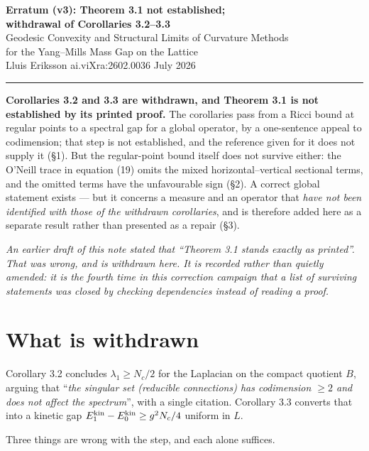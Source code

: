 \documentclass[11pt]{article}
\begin{document}
\begin{center}
{\Large\bfseries Erratum (v3): Theorem 3.1 not established;\\
withdrawal of Corollaries 3.2--3.3}\\[5pt]
{\large Geodesic Convexity and Structural Limits of Curvature Methods\\
for the Yang--Mills Mass Gap on the Lattice}\\[6pt]
Lluis Eriksson \quad\textbullet\quad ai.viXra:2602.0036 \quad\textbullet\quad July 2026
\end{center}

\noindent\rule{\textwidth}{0.8pt}

\vspace{2pt}
\noindent
\textbf{Corollaries 3.2 and 3.3 are withdrawn, and Theorem 3.1 is not established by
its printed proof.} The corollaries pass from a Ricci bound at regular points to a
spectral gap for a global operator, by a one-sentence appeal to codimension; that step
is not established, and the reference given for it does not supply it (\S1). But the
regular-point bound itself does not survive either: the O'Neill trace in equation (19)
omits the mixed horizontal--vertical sectional terms, and the omitted terms have the
unfavourable sign (\S2). A correct global statement exists --- but it concerns a
measure and an operator that \emph{have not been identified with those of the
withdrawn corollaries}, and is therefore added here as a separate result rather than
presented as a repair (\S3).

\emph{An earlier draft of this note stated that ``Theorem 3.1 stands exactly as
printed''. That was wrong, and is withdrawn here. It is recorded rather than quietly
amended: it is the fourth time in this correction campaign that a list of surviving
statements was closed by checking dependencies instead of reading a proof.}

\section{What is withdrawn}

Corollary 3.2 concludes
$\lambda_1\ge N_c/2$ for the Laplacian on the compact quotient $B$, arguing that
``\emph{the singular set (reducible connections) has codimension $\ge2$ and does not
affect the spectrum}'', with a single citation. Corollary 3.3 converts that into a
kinetic gap $E_1^{\rm kin}-E_0^{\rm kin}\ge g^2N_c/4$ uniform in $L$.

Three things are wrong with the step, and each alone suffices.
\end{document}
